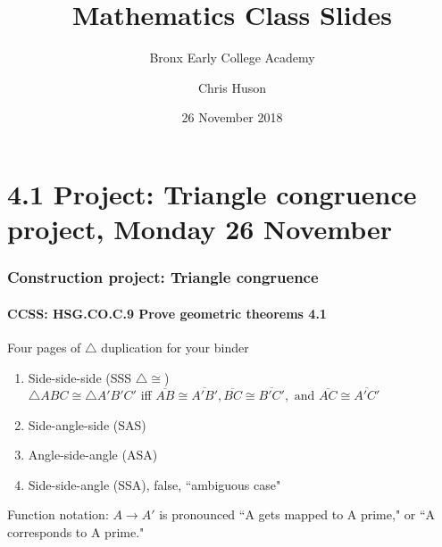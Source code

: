 \documentclass{beamer}
\title{Mathematics Class Slides}
\subtitle{Bronx Early College Academy}
\author{Chris Huson}
\date{26 November 2018}
\begin{document}
\frame{\titlepage}
\section[Outline]{}
\frame{\tableofcontents}


\section{4.1 Project: Triangle congruence project, Monday 26 November}
  \frame
  {
    \frametitle{Construction project: Triangle congruence}
    \framesubtitle{CCSS: HSG.CO.C.9 Prove geometric theorems  \alert{4.1}}

    \begin{block}{Four pages of $\triangle$ duplication for your binder}
    \begin{enumerate}
        \item Side-side-side (SSS $\triangle \cong$)\\
        $\triangle ABC \cong \triangle A'B'C'$ iff $\overline{AB} \cong \overline{A'B'}, \overline{BC} \cong \overline{B'C'}, \text{ and } \overline{AC} \cong \overline{A'C'}$
        \item Side-angle-side (SAS)
        \item Angle-side-angle (ASA)
        \item Side-side-angle (SSA), false, ``ambiguous case"
    \end{enumerate}
    \end{block}
    Function notation: $A \rightarrow A'$ is pronounced ``A gets mapped to A prime," or ``A corresponds to A prime."

    }
\end{document}
